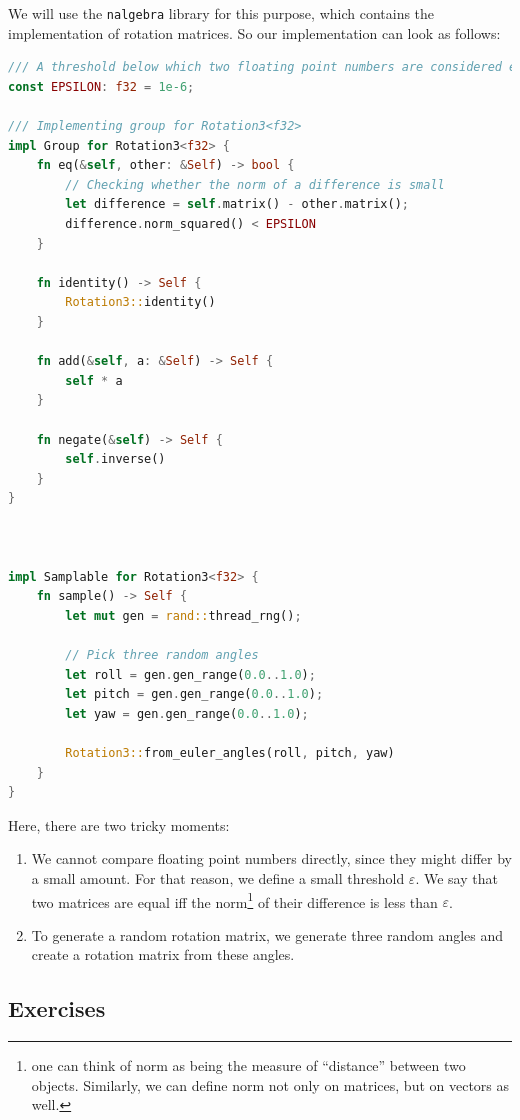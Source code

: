 \documentclass[../lecture-notes.tex]{subfiles}
\begin{document}
We will use the \texttt{nalgebra} library for this purpose, which contains the implementation of rotation matrices. So our implementation can look as follows:
\begin{lstlisting}[language=Rust]
/// A threshold below which two floating point numbers are considered equal.
const EPSILON: f32 = 1e-6;

/// Implementing group for Rotation3<f32>
impl Group for Rotation3<f32> {
    fn eq(&self, other: &Self) -> bool {
        // Checking whether the norm of a difference is small
        let difference = self.matrix() - other.matrix();
        difference.norm_squared() < EPSILON
    }

    fn identity() -> Self {
        Rotation3::identity()
    }

    fn add(&self, a: &Self) -> Self {
        self * a
    }

    fn negate(&self) -> Self {
        self.inverse()
    }
}



impl Samplable for Rotation3<f32> {
    fn sample() -> Self {
        let mut gen = rand::thread_rng();

        // Pick three random angles
        let roll = gen.gen_range(0.0..1.0);
        let pitch = gen.gen_range(0.0..1.0);
        let yaw = gen.gen_range(0.0..1.0);

        Rotation3::from_euler_angles(roll, pitch, yaw)
    }
}
\end{lstlisting}

Here, there are two tricky moments:
\begin{enumerate}
    \item We cannot compare floating point numbers directly, since they might differ by a small amount. For that reason, we define a small threshold $\varepsilon$. We say that two matrices are equal iff the norm\footnote{one can think of norm as being the measure of ``distance'' between two objects. Similarly, we can define norm not only on matrices, but on vectors as well.} of their difference is less than $\varepsilon$.
    \item To generate a random rotation matrix, we generate three random angles and create a rotation matrix from these angles.
\end{enumerate}

\subsection*{Exercises}
\end{document}
